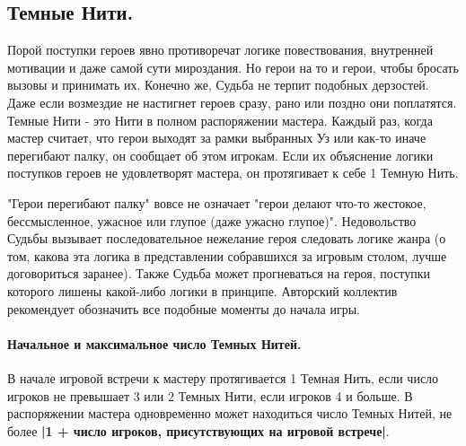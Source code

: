 \subsection{Темные Нити.} 
Порой поступки героев явно противоречат логике повествования, внутренней мотивации и даже самой сути мироздания. Но герои на то и герои, чтобы бросать вызовы и принимать их. Конечно же, Судьба не терпит подобных дерзостей. Даже если возмездие не настигнет героев сразу, рано или поздно они поплатятся.
\newline Темные Нити - это Нити в полном распоряжении мастера. Каждый раз, когда мастер считает, что герои выходят за рамки выбранных Уз или как-то иначе перегибают палку, он сообщает об этом игрокам. Если их объяснение логики поступков героев не удовлетворят мастера, он протягивает к себе 1 Темную Нить. 
\begin{tcolorbox}
    "Герои перегибают палку" вовсе не означает "герои делают что-то жестокое, бессмысленное, ужасное или глупое (даже ужасно глупое)". Недовольство Судьбы вызывает последовательное нежелание героя следовать логике жанра (о том, какова эта логика в представлении собравшихся за игровым столом, лучше договориться заранее). Также Судьба может прогневаться на героя, поступки которого лишены какой-либо логики в принципе. Авторский коллектив рекомендует обозначить все подобные моменты до начала игры.
\end{tcolorbox}
\paragraph{Начальное и максимальное число Темных Нитей.}
В начале игровой встречи к мастеру протягивается 1 Темная Нить, если число игроков не превышает 3 или 2 Темных Нити, если игроков 4 и больше.
\newline В распоряжении мастера одновременно может находиться число Темных Нитей, не более  \textbf{|1 + число игроков, присутствующих на игровой встрече|}.

